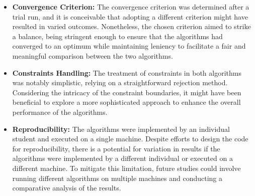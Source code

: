 \documentclass[10pt]{article}
\begin{document}
\begin{multicols}{2}
\begin{itemize}
    \item \textbf{Convergence Criterion:} The convergence criterion was determined after a trial run, and it is conceivable that adopting a different criterion might have resulted in varied outcomes. Nonetheless, the chosen criterion aimed to strike a balance, being stringent enough to ensure that the algorithms had converged to an optimum while maintaining leniency to facilitate a fair and meaningful comparison between the two algorithms.
    \item \textbf{Constraints Handling:} The treatment of constraints in both algorithms was notably simplistic, relying on a straightforward rejection method. Considering the intricacy of the constraint boundaries, it might have been beneficial to explore a more sophisticated approach to enhance the overall performance of the algorithms.
    \item \textbf{Reproducibility:} The algorithms were implemented by an individual student and executed on a single machine. Despite efforts to design the code for reproducibility, there is a potential for variation in results if the algorithms were implemented by a different individual or executed on a different machine. To mitigate this limitation, future studies could involve running different algorithms on multiple machines and conducting a comparative analysis of the results.
\end{itemize}
\end{multicols}

\newpage
\end{document}
